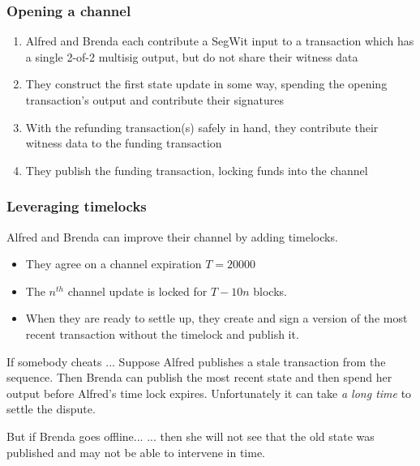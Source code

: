 \documentclass{beamer}
\begin{document}
\begin{frame}
	\frametitle{Opening a channel}
	\begin{enumerate}
		\item Alfred and Brenda each contribute a SegWit input to a transaction 
			which has a single 2-of-2 multisig output, but do not share their witness 
			data \pause
		\item They construct the first state update in some way, spending the 
			opening transaction's output and contribute their signatures \pause
		\item With the refunding transaction(s) safely in hand, they contribute 
			their witness data to the funding transaction  \pause
		\item They publish the funding transaction, locking funds into the channel
	\end{enumerate}
\end{frame}
\begin{frame}
	\frametitle{Leveraging timelocks}
	Alfred and Brenda can improve their channel by adding timelocks.
	\pause
	\begin{itemize}
		\item They agree on a channel expiration $ T = 20000 $ \pause
		\item The $ n^{th} $ channel update is locked for $ T - 10 n $ blocks. \pause
		\item When they are ready to settle up, they create and sign a version of 
			the most recent transaction without the timelock and publish it. \pause
	\end{itemize}
	\begin{block}{If somebody cheats ...}
		Suppose Alfred publishes a stale transaction from the sequence.  Then Brenda 
		can publish the most recent state and then spend her output before Alfred's 
		time lock expires.  Unfortunately it can take \emph{a long time} to settle 
		the dispute.
	\end{block}
	\pause
	\begin{block}{But if Brenda goes offline...}
		... then she will not see that the old state was published and may not be 
		able to intervene in time.
	\end{block}
\end{frame}
\end{document}
